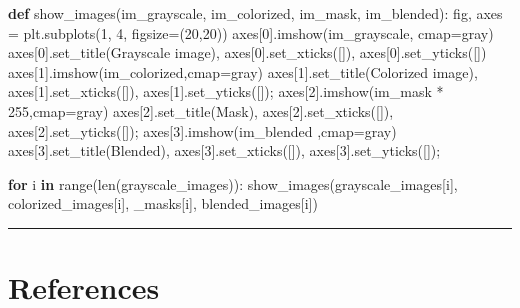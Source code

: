 \documentclass[
]{article}
\newenvironment{Shaded}{}{}
\newcommand{\BuiltInTok}[1]{#1}
\newcommand{\ControlFlowTok}[1]{\textcolor[rgb]{0.00,0.44,0.13}{\textbf{#1}}}
\newcommand{\DecValTok}[1]{\textcolor[rgb]{0.25,0.63,0.44}{#1}}
\newcommand{\KeywordTok}[1]{\textcolor[rgb]{0.00,0.44,0.13}{\textbf{#1}}}
\newcommand{\NormalTok}[1]{#1}
\newcommand{\OperatorTok}[1]{\textcolor[rgb]{0.40,0.40,0.40}{#1}}
\newcommand{\StringTok}[1]{\textcolor[rgb]{0.25,0.44,0.63}{#1}}
\begin{document}
\begin{Shaded}
\begin{Highlighting}[]
\KeywordTok{def}\NormalTok{ show\_images(im\_grayscale, im\_colorized, im\_mask, im\_blended):}
\NormalTok{    fig, axes }\OperatorTok{=}\NormalTok{ plt.subplots(}\DecValTok{1}\NormalTok{, }\DecValTok{4}\NormalTok{, figsize}\OperatorTok{=}\NormalTok{(}\DecValTok{20}\NormalTok{,}\DecValTok{20}\NormalTok{))}
\NormalTok{    axes[}\DecValTok{0}\NormalTok{].imshow(im\_grayscale, cmap}\OperatorTok{=}\StringTok{\textquotesingle{}gray\textquotesingle{}}\NormalTok{)}
\NormalTok{    axes[}\DecValTok{0}\NormalTok{].set\_title(}\StringTok{\textquotesingle{}Grayscale image\textquotesingle{}}\NormalTok{), axes[}\DecValTok{0}\NormalTok{].set\_xticks([]), axes[}\DecValTok{0}\NormalTok{].set\_yticks([])}
\NormalTok{    axes[}\DecValTok{1}\NormalTok{].imshow(im\_colorized,cmap}\OperatorTok{=}\StringTok{\textquotesingle{}gray\textquotesingle{}}\NormalTok{)}
\NormalTok{    axes[}\DecValTok{1}\NormalTok{].set\_title(}\StringTok{\textquotesingle{}Colorized image\textquotesingle{}}\NormalTok{), axes[}\DecValTok{1}\NormalTok{].set\_xticks([]), axes[}\DecValTok{1}\NormalTok{].set\_yticks([])}\OperatorTok{;}
\NormalTok{    axes[}\DecValTok{2}\NormalTok{].imshow(im\_mask }\OperatorTok{*} \DecValTok{255}\NormalTok{,cmap}\OperatorTok{=}\StringTok{\textquotesingle{}gray\textquotesingle{}}\NormalTok{)}
\NormalTok{    axes[}\DecValTok{2}\NormalTok{].set\_title(}\StringTok{\textquotesingle{}Mask\textquotesingle{}}\NormalTok{), axes[}\DecValTok{2}\NormalTok{].set\_xticks([]), axes[}\DecValTok{2}\NormalTok{].set\_yticks([])}\OperatorTok{;}
\NormalTok{    axes[}\DecValTok{3}\NormalTok{].imshow(im\_blended ,cmap}\OperatorTok{=}\StringTok{\textquotesingle{}gray\textquotesingle{}}\NormalTok{)}
\NormalTok{    axes[}\DecValTok{3}\NormalTok{].set\_title(}\StringTok{\textquotesingle{}Blended\textquotesingle{}}\NormalTok{), axes[}\DecValTok{3}\NormalTok{].set\_xticks([]), axes[}\DecValTok{3}\NormalTok{].set\_yticks([])}\OperatorTok{;}

\ControlFlowTok{for}\NormalTok{ i }\KeywordTok{in} \BuiltInTok{range}\NormalTok{(}\BuiltInTok{len}\NormalTok{(grayscale\_images)): }
\NormalTok{    show\_images(grayscale\_images[i], colorized\_images[i], \_masks[i], blended\_images[i])}
\end{Highlighting}
\end{Shaded}

\begin{center}\rule{0.5\linewidth}{0.5pt}\end{center}
\clearpage
\hypertarget{references}{%
\section*{References}\label{references}}
\end{document}
